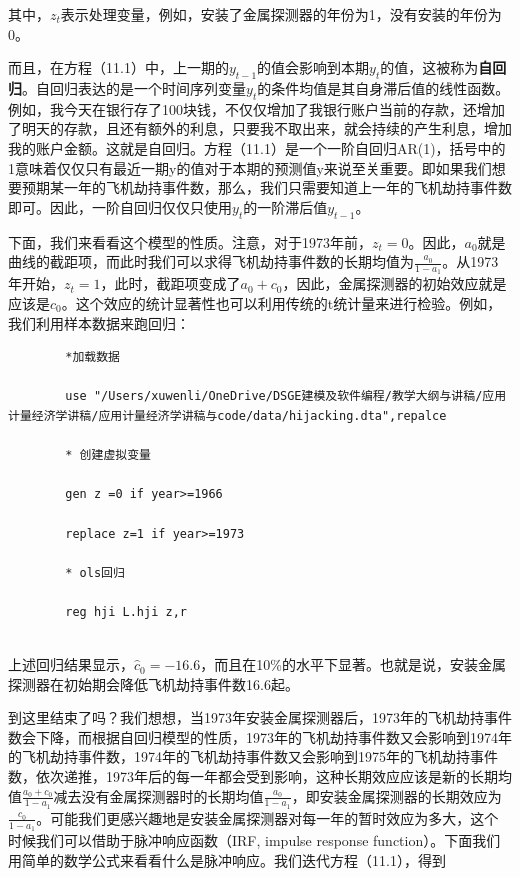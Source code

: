\documentclass[cn,12pt,math=newtx,citestyle=gb7714-2015,bibstyle=gb7714-2015]{elegantbook}
\begin{document}
	其中，$z_t$表示处理变量，例如，安装了金属探测器的年份为1，没有安装的年份为0。
	
	而且，在方程（11.1）中，上一期的$y_{t-1}$的值会影响到本期$y_t$的值，这被称为\textbf{自回归}。自回归表达的是一个时间序列变量$y_t$的条件均值是其自身滞后值的线性函数。例如，我今天在银行存了100块钱，不仅仅增加了我银行账户当前的存款，还增加了明天的存款，且还有额外的利息，只要我不取出来，就会持续的产生利息，增加我的账户金额。这就是自回归。方程（11.1）是一个一阶自回归AR(1)，括号中的1意味着仅仅只有最近一期y的值对于本期的预测值y来说至关重要。即如果我们想要预期某一年的飞机劫持事件数，那么，我们只需要知道上一年的飞机劫持事件数即可。因此，一阶自回归仅仅只使用$y_t$的一阶滞后值$y_{t-1}$。
	
	下面，我们来看看这个模型的性质。注意，对于1973年前，$z_t=0$。因此，$a_0$就是曲线的截距项，而此时我们可以求得飞机劫持事件数的长期均值为$\frac{a_0}{1-a_1}$。从1973年开始，$z_t=1$，此时，截距项变成了$a_0+c_0$，因此，金属探测器的初始效应就是应该是$c_0$。这个效应的统计显著性也可以利用传统的t统计量来进行检验。例如，我们利用样本数据来跑回归：
	
	\begin{lstlisting}
		*加载数据
		
		use "/Users/xuwenli/OneDrive/DSGE建模及软件编程/教学大纲与讲稿/应用计量经济学讲稿/应用计量经济学讲稿与code/data/hijacking.dta",repalce
		
		* 创建虚拟变量
		
		gen z =0 if year>=1966
		
		replace z=1 if year>=1973
		
		* ols回归
		
		reg hji L.hji z,r
		
	\end{lstlisting}
	
	上述回归结果显示，$\hat{c}_0=-16.6$，而且在10\%的水平下显著。也就是说，安装金属探测器在初始期会降低飞机劫持事件数16.6起。
	
	到这里结束了吗？我们想想，当1973年安装金属探测器后，1973年的飞机劫持事件数会下降，而根据自回归模型的性质，1973年的飞机劫持事件数又会影响到1974年的飞机劫持事件数，1974年的飞机劫持事件数又会影响到1975年的飞机劫持事件数，依次递推，1973年后的每一年都会受到影响，这种长期效应应该是新的长期均值$\frac{a_0+c_0}{1-a_1}$减去没有金属探测器时的长期均值$\frac{a_0}{1-a_1}$，即安装金属探测器的长期效应为$\frac{c_0}{1-a_1}$。可能我们更感兴趣地是安装金属探测器对每一年的暂时效应为多大，这个时候我们可以借助于脉冲响应函数（IRF, impulse response function）。下面我们用简单的数学公式来看看什么是脉冲响应。我们迭代方程（11.1），得到
	
\end{document}
